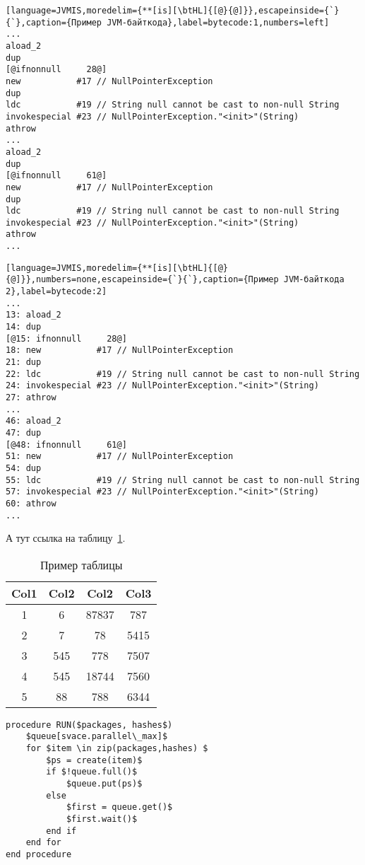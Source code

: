 \begin{lstlisting}[language=JVMIS,moredelim={**[is][\btHL]{[@}{@]}},escapeinside={`}{`},caption={Пример JVM-байткода},label=bytecode:1,numbers=left]
...
aload_2
dup
[@ifnonnull     28@]
new           #17 // NullPointerException
dup
ldc           #19 // String null cannot be cast to non-null String
invokespecial #23 // NullPointerException."<init>"(String)
athrow
...
aload_2
dup
[@ifnonnull     61@]
new           #17 // NullPointerException
dup
ldc           #19 // String null cannot be cast to non-null String
invokespecial #23 // NullPointerException."<init>"(String)
athrow
...
\end{lstlisting}
\egroup

\begin{lstlisting}[language=JVMIS,moredelim={**[is][\btHL]{[@}{@]}},numbers=none,escapeinside={`}{`},caption={Пример JVM-байткода 2},label=bytecode:2]
...
13: aload_2
14: dup
[@15: ifnonnull     28@]
18: new           #17 // NullPointerException
21: dup
22: ldc           #19 // String null cannot be cast to non-null String
24: invokespecial #23 // NullPointerException."<init>"(String)
27: athrow
...
46: aload_2
47: dup
[@48: ifnonnull     61@]
51: new           #17 // NullPointerException
54: dup
55: ldc           #19 // String null cannot be cast to non-null String
57: invokespecial #23 // NullPointerException."<init>"(String)
60: athrow
...
\end{lstlisting}

\clearpage

А тут ссылка на таблицу~\ref{table:1}.

\begin{table}[!htb]
\centering
\caption{Пример таблицы}
\label{table:1}
\begin{tabular}{| c | c | c | c |} 
    \hline
    Col1 & Col2 & Col2 & Col3 \\ [0.5ex] 
    \hline
    1 & 6 & 87837 & 787 \\
    \hline
    2 & 7 & 78 & 5415 \\
    \hline
    3 & 545 & 778 & 7507 \\
    \hline
    4 & 545 & 18744 & 7560 \\
    \hline
    5 & 88 & 788 & 6344 \\
    \hline
\end{tabular}
\end{table}

\begin{lstlisting}[style=algorithmic, caption={Привер псевдокода на алгоритмическом языке}]
procedure RUN($packages, hashes$)
    $queue[svace.parallel\_max]$
    for $item \in zip(packages,hashes) $
        $ps = create(item)$
        if $!queue.full()$
            $queue.put(ps)$
        else
            $first = queue.get()$
            $first.wait()$
        end if
    end for
end procedure
\end{lstlisting}
